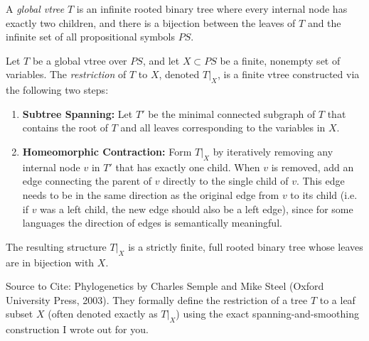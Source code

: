 \begin{definition}
A \emph{global vtree} $T$ is an infinite rooted binary tree where every internal node has exactly two children, and there is a bijection between the leaves of $T$ and the infinite set of all propositional symbols $\mathit{PS}$.
\end{definition}

\begin{definition}
Let $T$ be a global vtree over $\mathit{PS}$, and let $X \subset \mathit{PS}$ be a finite, nonempty set of variables. The \emph{restriction} of $T$ to $X$, denoted $T|_X$, is a finite vtree constructed via the following two steps:
\begin{enumerate}
    \item \textbf{Subtree Spanning:} Let $T'$ be the minimal connected subgraph of $T$ that contains the root of $T$ and all leaves corresponding to the variables in $X$.
    \item \textbf{Homeomorphic Contraction:} Form $T|_X$ by iteratively removing any internal node $v$ in $T'$ that has exactly one child. When $v$ is removed, add an edge connecting the parent of $v$ directly to the single child of $v$. This edge needs to be in the same direction as the original edge from $v$ to its child (i.e. if $v$ was a left child, the new edge should also be a left edge), since for some languages the direction of edges is semantically meaningful.
\end{enumerate}
The resulting structure $T|_X$ is a strictly finite, full rooted binary tree whose leaves are in bijection with $X$. 

Source to Cite: Phylogenetics by Charles Semple and Mike Steel (Oxford University Press, 2003). They formally define the restriction of a tree $T$ to a leaf subset $X$ (often denoted exactly as $T|_X$) using the exact spanning-and-smoothing construction I wrote out for you.
\end{definition}
